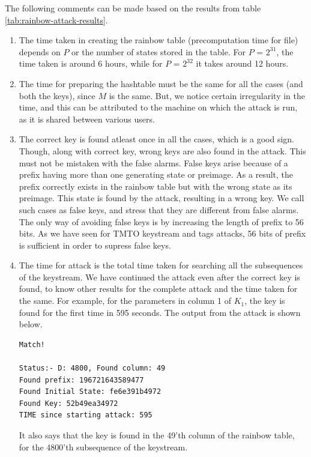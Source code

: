 The following comments can be made based on the results from table \ref{tab:rainbow-attack-results}.
\begin{enumerate}
\item The time taken in creating the rainbow table (precomputation time for file) depends on $P$ or the number of states stored in the table. For $P$ = $2^{31}$, the time taken is around 6 hours, while for $P$ = $2^{32}$ it takes around 12 hours. 

\item The time for preparing the hashtable must be the same for all the cases (and both the keys), since $M$ is the same. But, we notice certain irregularity in the time, and this can be attributed to the machine on which the attack is run, as it is shared between various users. 

\item The correct key is found atleast once in all the cases, which is a good sign. Though, along with correct key, wrong keys are also found in the attack. This must not be mistaken with the false alarms. False keys arise because of a prefix having more than one generating state or preimage. As a result, the prefix correctly exists in the rainbow table but with the wrong state as its preimage. This state is found by the attack, resulting in a wrong key. We call such cases as false keys, and stress that they are different from false alarms. The only way of avoiding false keys is by increasing the length of prefix to 56 bits. As we have seen for TMTO keystream and tags attacks, 56 bits of prefix is sufficient in order to supress false keys. 

\item The time for attack is the total time taken for searching all the subsequences of the keystream. We have continued the attack even after the correct key is found, to know other results for the complete attack and the time taken for the same. For example, for the parameters in column 1 of $K_1$, the key is found for the first time in 595 seconds. The output from the attack is shown below.

\begin{lstlisting}[frame=tb]
Match!

Status:- D: 4800, Found column: 49
Found prefix: 196721643589477
Found Initial State: fe6e391b4972
Found Key: 52b49ea34972
TIME since starting attack: 595
\end{lstlisting}

It also says that the key is found in the 49'th column of the rainbow table, for the 4800'th subsequence of the keystream. 
\end{enumerate}


